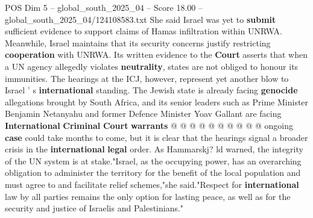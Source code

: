 \begin{textsample}{POS Dim 5 – global\_south\_2025\_04 – Score 18.00 – global\_south\_2025\_04/124108583.txt}
She said Israel was yet to \textbf{submit} sufficient evidence to support claims of Hamas infiltration within UNRWA.
Meanwhile, Israel maintains that its security concerns justify restricting \textbf{cooperation} with UNRWA.
Its written evidence to the \textbf{Court} asserts that when a UN agency allegedly violates \textbf{neutrality}, states are not obliged to honour its immunities.
The hearings at the ICJ, however, represent yet another blow to Israel ' s \textbf{international} standing.
The Jewish state is already facing \textbf{genocide} allegations brought by South Africa, and its senior leaders such as Prime Minister Benjamin Netanyahu and former Defence Minister Yoav Gallant are facing \textbf{International} \textbf{Criminal} \textbf{Court} \textbf{warrants} @ @ @ @ @ @ @ @ @ @ ongoing \textbf{case} could take months to come, but it is clear that the hearings signal a broader crisis in the \textbf{international} \textbf{legal} order.
As Hammarskj? ld warned, the integrity of the UN system is at stake."Israel, as the occupying power, has an overarching obligation to administer the territory for the benefit of the local population and must agree to and facilitate relief schemes,"she said."Respect for \textbf{international} law by all parties remains the only option for lasting peace, as well as for the security and justice of Israelis and Palestinians."

\end{textsample}

